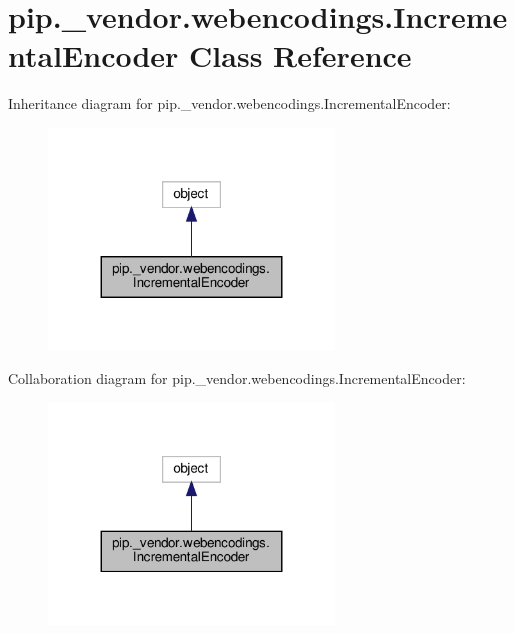 \hypertarget{classpip_1_1__vendor_1_1webencodings_1_1IncrementalEncoder}{}\section{pip.\+\_\+vendor.\+webencodings.\+Incremental\+Encoder Class Reference}
\label{classpip_1_1__vendor_1_1webencodings_1_1IncrementalEncoder}


Inheritance diagram for pip.\+\_\+vendor.\+webencodings.\+Incremental\+Encoder\+:
\nopagebreak
\begin{figure}[H]
\begin{center}
\leavevmode
\includegraphics[width=215pt]{classpip_1_1__vendor_1_1webencodings_1_1IncrementalEncoder__inherit__graph}
\end{center}
\end{figure}


Collaboration diagram for pip.\+\_\+vendor.\+webencodings.\+Incremental\+Encoder\+:
\nopagebreak
\begin{figure}[H]
\begin{center}
\leavevmode
\includegraphics[width=215pt]{classpip_1_1__vendor_1_1webencodings_1_1IncrementalEncoder__coll__graph}
\end{center}
\end{figure}
